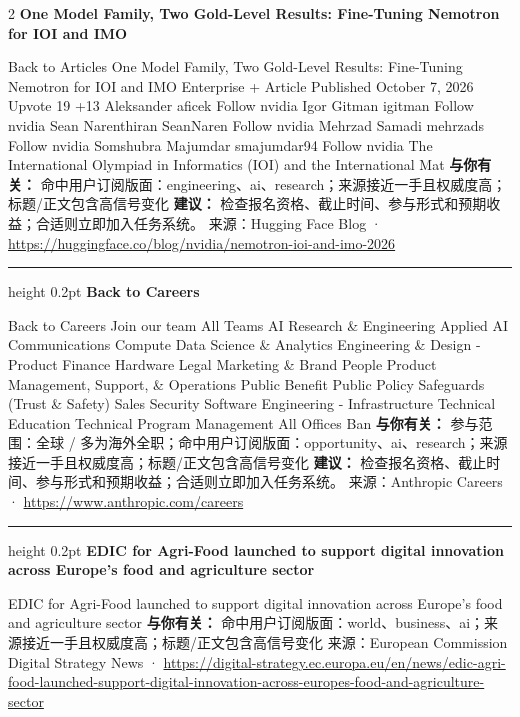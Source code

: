 \documentclass[10.5pt]{ctexart}
\begin{document}
\begin{multicols}{2}
{\large\bfseries One Model Family, Two Gold-Level Results: Fine-Tuning Nemotron for IOI and IMO}\par
Back to Articles One Model Family, Two Gold-Level Results: Fine-Tuning Nemotron for IOI and IMO Enterprise + Article Published October 7, 2026 Upvote 19 +13 Aleksander aficek Follow nvidia Igor Gitman igitman Follow nvidia Sean Narenthiran SeanNaren Follow nvidia Mehrzad Samadi mehrzads Follow nvidia Somshubra Majumdar smajumdar94 Follow nvidia The International Olympiad in Informatics (IOI) and the International Mat
\textbf{与你有关：} 命中用户订阅版面：engineering、ai、research；来源接近一手且权威度高；标题/正文包含高信号变化
\textbf{建议：} 检查报名资格、截止时间、参与形式和预期收益；合适则立即加入任务系统。
{\footnotesize\color{ormuted} 来源：Hugging Face Blog · \url{https://huggingface.co/blog/nvidia/nemotron-ioi-and-imo-2026}}
\vspace{2mm}
\hrule height 0.2pt
\vspace{2mm}
{\large\bfseries Back to Careers}\par
Back to Careers Join our team All Teams AI Research \& Engineering Applied AI Communications Compute Data Science \& Analytics Engineering \& Design - Product Finance Hardware Legal Marketing \& Brand People Product Management, Support, \& Operations Public Benefit Public Policy Safeguards (Trust \& Safety) Sales Security Software Engineering - Infrastructure Technical Education Technical Program Management All Offices Ban
\textbf{与你有关：} 参与范围：全球 / 多为海外全职；命中用户订阅版面：opportunity、ai、research；来源接近一手且权威度高；标题/正文包含高信号变化
\textbf{建议：} 检查报名资格、截止时间、参与形式和预期收益；合适则立即加入任务系统。
{\footnotesize\color{ormuted} 来源：Anthropic Careers · \url{https://www.anthropic.com/careers}}
\vspace{2mm}
\hrule height 0.2pt
\vspace{2mm}
{\large\bfseries EDIC for Agri-Food launched to support digital innovation across Europe’s food and agriculture sector}\par
EDIC for Agri-Food launched to support digital innovation across Europe’s food and agriculture sector
\textbf{与你有关：} 命中用户订阅版面：world、business、ai；来源接近一手且权威度高；标题/正文包含高信号变化
{\footnotesize\color{ormuted} 来源：European Commission Digital Strategy News · \url{https://digital-strategy.ec.europa.eu/en/news/edic-agri-food-launched-support-digital-innovation-across-europes-food-and-agriculture-sector}}

\end{multicols}
\end{document}
